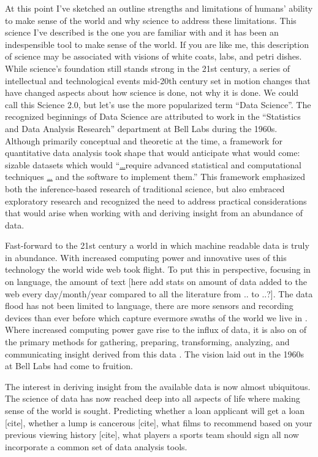 \documentclass[
]{article}
\begin{document}
At this point I've sketched an outline strengths and limitations of humans' ability to make sense of the world and why science to address these limitations. This science I've described is the one you are familiar with and it has been an indespensible tool to make sense of the world. If you are like me, this description of science may be associated with visions of white coats, labs, and petri dishes. While science's foundation still stands strong in the 21st century, a series of intellectual and technological events mid-20th century set in motion changes that have changed aspects about how science is done, not why it is done. We could call this Science 2.0, but let's use the more popularized term ``Data Science''. The recognized beginnings of Data Science are attributed to work in the ``Statistics and Data Analysis Research'' department at Bell Labs during the 1960s. Although primarily conceptual and theoretic at the time, a framework for quantitative data analysis took shape that would anticipate what would come: sizable datasets which would ``\protect\hyperlink{section-6}{\ldots{}}require advanced statistical and computational techniques \protect\hyperlink{section-6}{\ldots{}} and the software to implement them.'' \citep{Chambers2020} This framework emphasized both the inference-based research of traditional science, but also embraced exploratory research and recognized the need to address practical considerations that would arise when working with and deriving insight from an abundance of data.

Fast-forward to the 21st century a world in which machine readable data is truly in abundance. With increased computing power and innovative uses of this technology the world wide web took flight. To put this in perspective, focusing in on language, the amount of text {[}here add stats on amount of data added to the web every day/month/year compared to all the literature from .. to ..?{]}. The data flood has not been limited to language, there are more sensors and recording devices than ever before which capture evermore swaths of the world we live in \citep{Desjardins2019}. Where increased computing power gave rise to the influx of data, it is also on of the primary methods for gathering, preparing, transforming, analyzing, and communicating insight derived from this data \citep{Donoho2017}. The vision laid out in the 1960s at Bell Labs had come to fruition.

The interest in deriving insight from the available data is now almost ubiquitous. The science of data has now reached deep into all aspects of life where making sense of the world is sought. Predicting whether a loan applicant will get a loan {[}cite{]}, whether a lump is cancerous {[}cite{]}, what films to recommend based on your previous viewing history {[}cite{]}, what players a sports team should sign \citep{Lewis2004} all now incorporate a common set of data analysis tools.
\end{document}
